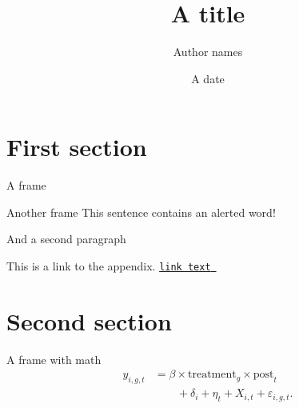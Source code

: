 \documentclass[aspectratio=169, 11pt]{beamer}
\title[Some title]{A title}
\author{Author names}
\date{A date}
\begin{document}
\maketitle

\section{First section}

\begin{frame}{A frame}
    
\end{frame}

\begin{frame}{Another frame}
    This sentence contains an \alert{alerted} word!\pause
    
    And a second paragraph\pause
    
    This is a link to the appendix. \hyperlink{app_example}{\texttt{link text}~ }
\end{frame}

\section{Second section}

\begin{frame}{A frame with math}
    \begin{equation}
    \begin{aligned}
        y_{i,g,t} &= \beta \times \text{treatment}_g \times \text{post}_t \\
        &\qquad + \delta_i + \eta_t + X_{i,t} + \varepsilon_{i,g,t}.
    \end{aligned}
    \end{equation}
\end{frame}
\end{document}
